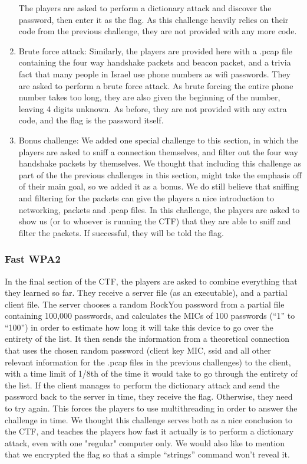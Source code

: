 \documentclass[sigconf]{acmart}
\begin{document}
\begin{enumerate}
  The players are asked to perform a dictionary attack and discover the password, then enter it as the flag.
  As this challenge heavily relies on their code from the previous challenge, they are not provided with any more code.
\item Brute force attack:
  Similarly, the players are provided here with a .pcap file containing the four way handshake packets and beacon packet, and a trivia fact that many people in Israel use phone numbers as wifi passwords. They are asked to perform a brute force attack. As brute forcing the entire phone number takes too long, they are also given the beginning of the number, leaving 4 digits unknown. As before, they are not provided with any extra code, and the flag is the password itself.
\item Bonus challenge:
  We added one special challenge to this section, in which the players are asked to sniff a connection themselves, and filter out the four way handshake packets by themselves. We thought that including this challenge as part of the the previous challenges in this section, might take the emphasis off of their main goal, so we added it as a bonus. We do still believe that sniffing and filtering for the packets can give the players a nice introduction to networking, packets and .pcap files.
  In this challenge, the players are asked to show us (or to whoever is running the CTF) that they are able to sniff and filter the packets. If successful, they will be told the flag.
  \end{enumerate}

\subsubsection{Fast WPA2}
In the final section of the CTF, the players are asked to combine everything that they learned so far. They receive a server file (as an executable), and a partial client file.
The server chooses a random RockYou password from a partial file containing 100,000 passwords, and calculates the MICs of 100 passwords (“1” to “100”) in order to estimate how long it will take this device to go over the entirety of the list. It then sends the information from a theoretical connection that uses the chosen random password (client key MIC, ssid and all other relevant information for the .pcap files in the previous challenges) to the client, with a time limit of 1/8th of the time it would take to go through the entirety of the list. If the client manages to perform the dictionary attack and send the password back to the server in time, they receive the flag. Otherwise, they need to try again.
This forces the players to use multithreading in order to answer the challenge in time.
We thought this challenge serves both as a nice conclusion to the CTF, and teaches the players how fast it actually is to perform a dictionary attack, even with one "regular" computer only.
We would also like to mention that we encrypted the flag so that a simple “strings” command won’t reveal it.
\end{document}
